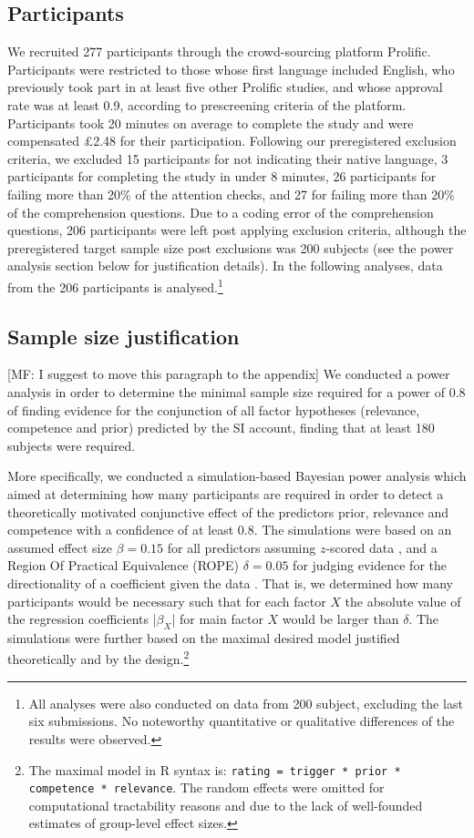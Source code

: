 \documentclass{sp}
\newcommand{\mf}[1]{\textcolor{BurntOrange}{[MF: #1]}}
\begin{document}
\subsection{Participants}
We recruited 277 participants through the crowd-sourcing platform Prolific. Participants were restricted to those whose first language included English, who previously took part in at least five other Prolific studies, and whose approval rate was at least 0.9, according to prescreening criteria of the platform. Participants took 20 minutes on average to complete the study and were compensated \pounds2.48 for their participation. Following our preregistered exclusion criteria, we excluded 15 participants for not indicating their native language, 3 participants for completing the study in under 8 minutes, 26 participants for failing more than 20\% of the attention checks, and 27 for failing more than 20\% of the comprehension questions. Due to a coding error of the comprehension questions, 206 participants were left post applying exclusion criteria, although the preregistered target sample size post exclusions was 200 subjects (see the power analysis section below for justification details).
In the following analyses, data from the 206 participants is analysed.\footnote{All analyses were also conducted on data from 200 subject, excluding the last six submissions. No noteworthy quantitative or qualitative differences of the results were observed.}

\subsection{Sample size justification}
\mf{I suggest to move this paragraph to the appendix}
We conducted a power analysis in order to determine the minimal sample size required for a power of 0.8 of finding evidence for the conjunction of all factor hypotheses (relevance, competence and prior) predicted by the SI account, finding that at least 180 subjects were required. 

More specifically, we conducted a simulation-based Bayesian power analysis which aimed at determining how many participants are required in order to detect a theoretically motivated conjunctive effect of the predictors prior, relevance and competence with a confidence of at least 0.8. The simulations were based on an assumed effect size $\beta = 0.15$ for all predictors assuming $z$-scored data \citep[e.g.,][]{degen2015investigating}, and a Region Of Practical Equivalence (ROPE) $\delta = 0.05$ for judging evidence for the directionality of a coefficient given the data \citep{kruschke2014doing}. That is, we determined how many participants would be necessary such that for each factor $X$ the absolute value of the regression coefficients |$\beta_X$| for main factor $X$ would be larger than $\delta$.
The simulations were further based on the maximal desired model justified theoretically and by the design.\footnote{The maximal model in R syntax is: \texttt{rating = trigger * prior * competence * relevance}. The random effects were omitted for computational tractability reasons and due to the lack of well-founded estimates of group-level effect sizes.}
\end{document}
